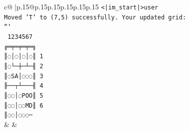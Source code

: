 \documentclass{article}
\begin{document}
{\begin{supertabular}{c@{$\;$}|p{.15\linewidth}@{}p{.15\linewidth}p{.15\linewidth}p{.15\linewidth}p{.15\linewidth}p{.15\linewidth}}
{{{\texttt{<|im\_start|>user} \\
\texttt{Moved 'T' to (7,5) successfully. Your updated grid:} \\
\texttt{```} \\
\texttt{ 1234567} \\
\texttt{╔═╤═╤═╤═╗} \\
\texttt{║◌│◌│◌│◌║ 1} \\
\texttt{║◌└─┼─┴─╢ 2} \\
\texttt{║◌SA│◌◌◌║ 3} \\
\texttt{╟──┬┴───╢ 4} \\
\texttt{║◌◌│◌POO║ 5} \\
\texttt{║◌◌│◌◌MD║ 6} \\
\texttt{║◌◌│◌◌◌─} \\
            }
        }
    }
    & & \\ \\


\end{supertabular}}
\end{document}
